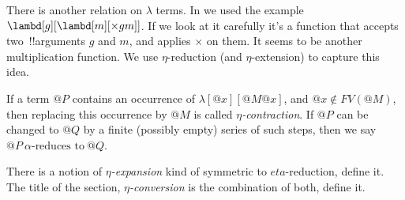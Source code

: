 \documentclass[../../../include/open-logic-section]{subfiles}
\begin{document}

There is another relation on $\lambda$ terms. In
\olref[lc][int][fv] we used the example $\lambd[g][\lambd[m][\times g
m]]$. If we look at it carefully it's a function that accepts two~!!{argument}s
$g$ and $m$, and applies $\times$ on them. It seems to be another
multiplication function. We use $\eta$-reduction (and $\eta$-extension) to
capture this idea.

\begin{defn}
  If a term $@P$ contains an occurrence of $\lambda[@x][@M @x]$, and $@x
  \notin FV(@M)$, then replacing this occurrence by $@M$ is called \emph{$\eta$-contraction}. If $@P$ can be changed to
  $@Q$ by a finite (possibly empty) series of such steps, then we say
  $@P ~\alpha\text{-reduces to}~@Q$.
\end{defn}

\begin{prob}
  There is a notion of \emph{$\eta$-expansion} kind of symmetric to
  $eta$-reduction, define it. The title of the section,
  \emph{$\eta$-conversion} is the combination of both, define it.
\end{prob}
\end{document}
